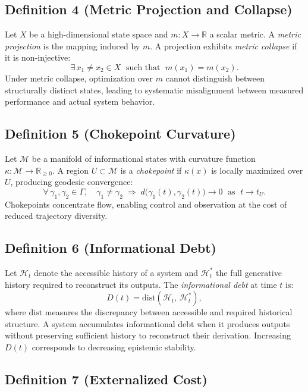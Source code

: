 \documentclass[12pt, a4paper]{article}
\begin{document}
\subsection*{Definition 4 (Metric Projection and Collapse)}

Let $X$ be a high-dimensional state space and $m \colon X \to \mathbb{R}$ a scalar metric. A \emph{metric projection} is the mapping induced by $m$. A projection exhibits \emph{metric collapse} if it is non-injective:
\[
\exists\, x_1 \neq x_2 \in X \;\text{ such that }\; m(x_1) = m(x_2).
\]
Under metric collapse, optimization over $m$ cannot distinguish between structurally distinct states, leading to systematic misalignment between measured performance and actual system behavior.

\subsection*{Definition 5 (Chokepoint Curvature)}

Let $\mathcal{M}$ be a manifold of informational states with curvature function $\kappa \colon \mathcal{M} \to \mathbb{R}_{\geq 0}$. A region $U \subset \mathcal{M}$ is a \emph{chokepoint} if $\kappa(x)$ is locally maximized over $U$, producing geodesic convergence:
\[
\forall\, \gamma_1, \gamma_2 \in \Gamma,\quad \gamma_1 \neq \gamma_2 \;\Rightarrow\; d\bigl(\gamma_1(t), \gamma_2(t)\bigr) \to 0 \;\text{ as }\; t \to t_U.
\]
Chokepoints concentrate flow, enabling control and observation at the cost of reduced trajectory diversity.

\subsection*{Definition 6 (Informational Debt)}

Let $\mathcal{H}_t$ denote the accessible history of a system and $\mathcal{H}_t^*$ the full generative history required to reconstruct its outputs. The \emph{informational debt} at time $t$ is:
\[
D(t) = \mathrm{dist}(\mathcal{H}_t,\, \mathcal{H}_t^*),
\]
where $\mathrm{dist}$ measures the discrepancy between accessible and required historical structure. A system accumulates informational debt when it produces outputs without preserving sufficient history to reconstruct their derivation. Increasing $D(t)$ corresponds to decreasing epistemic stability.

\subsection*{Definition 7 (Externalized Cost)}
\end{document}
